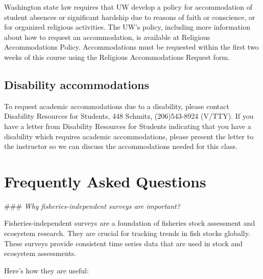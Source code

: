 \documentclass[
  letterpaper,
  oneside,
  open=any]{scrbook}
\begin{document}
Washington state law requires that UW develop a policy for accommodation
of student absences or significant hardship due to reasons of faith or
conscience, or for organized religious activities. The UW's policy,
including more information about how to request an accommodation, is
available at Religious Accommodations Policy. Accommodations must be
requested within the first two weeks of this course using the Religious
Accommodations Request form.

\section{Disability accommodations}\label{disability-accommodations}

To request academic accommodations due to a disability, please contact
Disability Resources for Students, 448 Schmitz, (206)543-8924 (V/TTY).
If you have a letter from Disability Resources for Students indicating
that you have a disability which requires academic accommodations,
please present the letter to the instructor so we can discuss the
accommodations needed for this class.


\chapter{Frequently Asked Questions}\label{frequently-asked-questions}

\#\#\# \emph{Why fisheries-independent surveys are important?}

Fisheries-independent surveys are a foundation of fisheries stock
assessment and ecosystem research. They are crucial for tracking trends
in fish stocks globally. These surveys provide consistent time series
data that are used in stock and ecosystem assessments.

Here's how they are useful:
\end{document}
